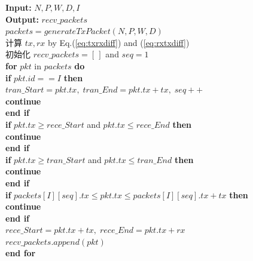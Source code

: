 \begin{algorithm}[htbp]
\caption{大规模集群收发包仿真算法}
\label{alg:sim_alg}
\setlength{\baselineskip}{0.98\baselineskip}
\textbf{Input:} $N, P, W, D, I$ \\
\textbf{Output:} $recv\_packets$ \\
$packets = generateTxPacket(N, P, W, D)$ \\
计算 $tx, rx$ by Eq.(\ref{eq:txrxdiff}) and (\ref{eq:rxtxdiff}) \\
初始化 $recv\_packets = [\,]$ and $seq = 1$ \\
\textbf{for} $pkt$ in $packets$ \textbf{do} \\
\hspace*{1em} \textbf{if} $pkt.id == I$ \textbf{then} \\
\hspace*{1em} $tran\_Start = pkt.tx,\; tran\_End = pkt.tx + tx,\; seq++$ \\
\hspace*{1em} \textbf{continue} \\
\hspace*{1em} \textbf{end if} \\
\hspace*{1em} \textbf{if} $pkt.tx \ge rece\_Start$ and $pkt.tx \le rece\_End$ \textbf{then} \\
\hspace*{1em} \textbf{continue} \\
\hspace*{1em} \textbf{end if} \\
\hspace*{1em} \textbf{if} $pkt.tx \ge tran\_Start$ and $pkt.tx \le tran\_End$ \textbf{then} \\
\hspace*{1em} \textbf{continue} \\
\hspace*{1em} \textbf{end if} \\
\hspace*{1em} \textbf{if} $packets[I][seq].tx \le pkt.tx \le packets[I][seq].tx + tx$ \textbf{then} \\
\hspace*{1em} \textbf{continue} \\
\hspace*{1em} \textbf{end if} \\
\hspace*{1em} $rece\_Start = pkt.tx + tx,\; rece\_End = pkt.tx + rx$ \\
\hspace*{1em} $recv\_packets.append(pkt)$ \\
\textbf{end for}

\end{algorithm}

